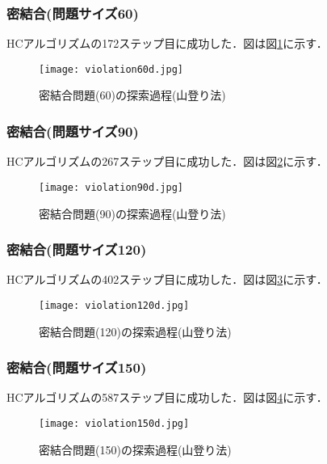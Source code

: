 \documentclass[a4j]{jarticle}
\begin{document}
\subsubsection*{密結合(問題サイズ60)}
HCアルゴリズムの172ステップ目に成功した．図は図\ref{60d}に示す．
\begin{figure}[htb]
 \begin{center}
  \texttt{[image: violation60d.jpg]}
  \caption{密結合問題(60)の探索過程(山登り法)}
  \label{60d}
 \end{center}
\end{figure}

\subsubsection*{密結合(問題サイズ90)}
HCアルゴリズムの267ステップ目に成功した．図は図\ref{90d}に示す．
\begin{figure}[htb]
 \begin{center}
  \texttt{[image: violation90d.jpg]}
  \caption{密結合問題(90)の探索過程(山登り法)}
  \label{90d}
 \end{center}
\end{figure}
\newpage
\subsubsection*{密結合(問題サイズ120)}
HCアルゴリズムの402ステップ目に成功した．図は図\ref{120d}に示す．
\begin{figure}[htb]
 \begin{center}
  \texttt{[image: violation120d.jpg]}
  \caption{密結合問題(120)の探索過程(山登り法)}
  \label{120d}
 \end{center}
\end{figure}

\subsubsection*{密結合(問題サイズ150)}
HCアルゴリズムの587ステップ目に成功した．図は図\ref{150d}に示す．
\begin{figure}[htb]
 \begin{center}
  \texttt{[image: violation150d.jpg]}
  \caption{密結合問題(150)の探索過程(山登り法)}
  \label{150d}
 \end{center}
\end{figure}
\end{document}
